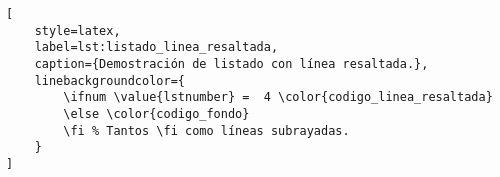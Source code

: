 \begin{lstlisting}[
	style=latex,
	label=lst:listado_linea_resaltada,
	caption={Demostración de listado con línea resaltada.},
	linebackgroundcolor={
		\ifnum \value{lstnumber} =  4 \color{codigo_linea_resaltada}
		\else \color{codigo_fondo}
		\fi % Tantos \fi como líneas subrayadas.
	}
]

\end{lstlisting}